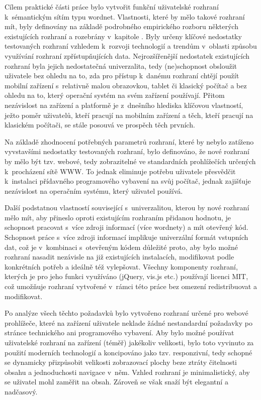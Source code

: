 \documentclass[a4paper, 11pt, oneside, showtrims]{book}
\newcommand{\itNameRef}[1]{\textit{\nameref{#1}}}
\begin{document}

			Cílem praktické části práce bylo vytvořit funkční uživatelské rozhraní k~sémantickým sítím typu wordnet. Vlastnosti, které by mělo takové rozhraní mít, byly definovány na základě podrobného empirického rozboru některých existujících rozhraní a rozebrány v~kapitole \itNameRef{cha:navrh}. Byly určeny klíčové nedostatky testovaných rozhraní vzhledem k~rozvoji technologií a trendům v~oblasti způsobu využívání rozhraní zpřístupňujících data. Nejrozšířenější nedostatek existujících rozhraní byla jejich nedostatečná univerzalita, tedy (ne)schopnost obsloužit uživatele bez ohledu na to, zda pro přístup k~danému rozhraní chtějí použít mobilní zařízení s~relativně malou obrazovkou, tablet či klasický počítač a bez ohledu na to, který operační systém na svém zařízení používají. Přitom nezávislost na zařízení a platformě je z~dnešního hlediska klíčovou vlastností, ježto poměr uživatelů, kteří pracují na mobilním zařízení a těch, kteří pracují na klasickém počítači, se stále posouvá ve prospěch těch prvních.

			Na základě zhodnocení potřebných parametrů rozhraní, které by nebylo zatíženo vyvstavšími nedostatky testovaných rozhraní, bylo definováno, že nové rozhraní by mělo být tzv. webové, tedy zobrazitelné ve standardních prohlížečích určených k~procházení sítě WWW. To jednak eliminuje potřebu uživatele přesvědčit k~instalaci přídavného programového vybavení na svůj počítač, jednak zajišťuje nezávislost na operačním systému, který uživatel používá. 

			Další podstatnou vlastností související s~univerzalitou, kterou by nové rozhraní mělo mít, aby přineslo oproti existujícím rozhraním přidanou hodnotu, je schopnost pracovat s~více zdroji informací (více wordnety) a mít otevřený kód. Schopnost práce s~více zdroji informací implikuje univerzální formát vstupních dat, což je v~kombinaci s~otevřeným kódem důležité proto, aby bylo možné rozhraní nasadit nezávisle na již existujících instalacích, modifikovat podle konkrétních potřeb a ideálně též vylepšovat. Všechny komponenty rozhraní, kterých je pro jeho funkci využíváno (jQuery, vis.js etc.) používají licenci MIT, což umožňuje rozhraní vytvořené v~rámci této práce bez omezení redistribuovat a modifikovat. 

			Po analýze všech těchto požadavků bylo vytvořeno rozhraní určené pro webové prohlížeče, které na zařízení uživatele neklade žádné nestandardní požadavky  po stránce technického ani programového vybavení. Aby bylo možné používat uživatelské rozhraní na zařízení (téměř) jakékoliv velikosti, bylo toto vyvinuto za použití moderních technologií a koncipováno jako tzv. responzivní, tedy schopné se dynamicky přizpůsobit velikosti zobrazovací plochy beze ztráty čitelnosti obsahu a jednoduchosti navigace v~něm. Vzhled rozhraní je minimalistický, aby se uživatel mohl zaměřit na obsah. Zároveň se však snaží být elegantní a nadčasový.
\end{document}

